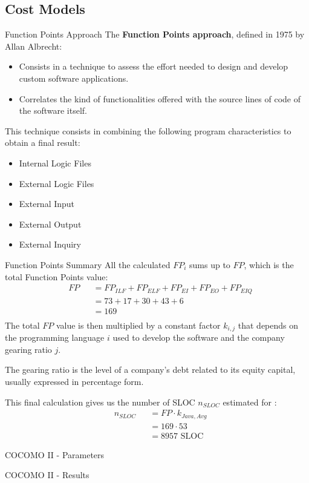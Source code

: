 \documentclass{../common/latex_classes/pdf_presentation}
\begin{document}
	\subsection{Cost Models}
	\begin{frame}{Function Points Approach}
		The \textbf{Function Points approach}, defined in 1975 by Allan Albrecht:
		\begin{itemize}
			\item Consists in a technique to assess the effort needed to design and develop custom software applications.
			\item Correlates the kind of functionalities offered with the source lines of code of the software itself.
		\end{itemize}
		\medskip
		This technique consists in combining the following program characteristics to obtain a final result:
		\begin{itemize}
			\item Internal Logic Files
			\item External Logic Files
			\item External Input
			\item External Output
			\item External Inquiry
		\end{itemize}
	\end{frame}
	\begin{frame}{Function Points Summary}
		All the calculated $FP_{i}$ sums up to $FP$, which is the total Function Points value:
		\begin{equation*}
			\begin{aligned}
				&	FP
				& & = FP_{ILF} + FP_{ELF} + FP_{EI} + FP_{EO} + FP_{EIQ}\\
				&&& = 73 + 17 + 30 + 43 + 6\\
				&&& = 169\\	
			\end{aligned}
		\end{equation*}
		The total $FP$ value is then multiplied by a constant factor $k_{i,j}$ that depends on the programming language $i$ used to develop the software and the company gearing ratio $j$.\par
		The gearing ratio is the level of a company's debt related to its equity capital, usually expressed in percentage form.\par
		This final calculation gives us the number of SLOC $n_{SLOC}$ estimated for \myTaxiService{}:
		\begin{equation*}
			\begin{aligned}
				&   n_{SLOC}
				& & = FP \cdot k_{Java, Avg}\\
				&&& = 169 \cdot 53\\
				&&& = 8957 \text{ SLOC}
			\end{aligned}
		\end{equation*}
	\end{frame}
	\begin{frame}{COCOMO II - Parameters}
	\end{frame}
	\begin{frame}{COCOMO II - Results}
	\end{frame}
\end{document}
